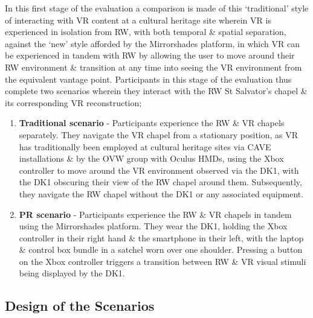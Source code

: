 In this first stage of the evaluation a comparison is made of this `traditional' style of interacting with VR content at a cultural heritage site wherein VR is experienced in isolation from RW, with both temporal \& spatial separation, against the `new' style afforded by the Mirrorshades platform, in which VR can be experienced in tandem with RW by allowing the user to move around their RW environment \& transition at any time into seeing the VR environment from the equivalent vantage point. Participants in this stage of the evaluation thus complete two scenarios wherein they interact with the RW St Salvator's chapel \& its corresponding VR reconstruction;

\begin{enumerate}
	\item \textbf{Traditional scenario} - Participants experience the RW \& VR chapels separately. They navigate the VR chapel from a stationary position, as VR has traditionally been employed at cultural heritage sites via CAVE installations \& by the OVW group with Oculus HMDs, using the Xbox controller to move around the VR environment observed via the DK1, with the DK1 obscuring their view of the RW chapel around them. Subsequently, they navigate the RW chapel without the DK1 or any associated equipment.
	\item \textbf{PR scenario} - Participants experience the RW \& VR chapels in tandem using the Mirrorshades platform. They wear the DK1, holding the Xbox controller in their right hand \& the smartphone in their left, with the laptop \& control box bundle in a satchel worn over one shoulder. Pressing a button on the Xbox controller triggers a transition between RW \& VR visual stimuli being displayed by the DK1.
\end{enumerate}


\subsection{Design of the Scenarios}

